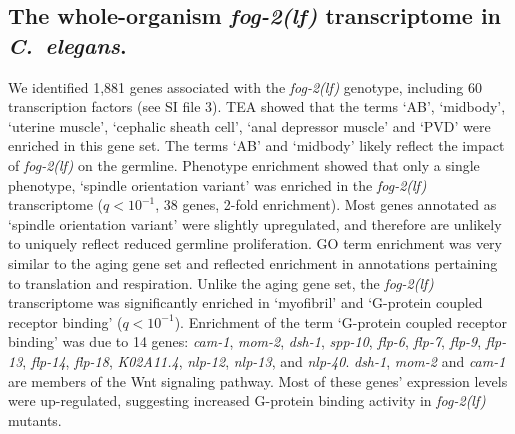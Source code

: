 \documentclass[10pt,letterpaper,twocolumn]{article}
\newcommand{\cel}{\emph{C.~elegans}}
\newcommand{\fog}{\emph{\mbox{fog-2(lf)}}}
\newcommand{\gene}[1]{\emph{\mbox{#1}}}
\newcommand{\fogn}{1,881}
\newcommand{\tffog}{60}
\begin{document}
\subsection*{The whole-organism \fog{} transcriptome in \cel{}.}
We identified \fogn{} genes associated with the \fog{} genotype, including
\tffog{} transcription factors (see SI file 3). TEA showed that the terms `AB',
`midbody', `uterine muscle', `cephalic sheath cell', `anal depressor muscle' and
`PVD' were enriched in this gene set. The terms `AB' and `midbody' likely reflect
the impact of \fog{} on the germline.
Phenotype enrichment showed that only a single phenotype, `spindle orientation
variant' was enriched in the \fog{} transcriptome ($q<10^{-1}$, 38 genes, 2-fold
enrichment). Most genes annotated as `spindle orientation variant' were
slightly upregulated, and therefore are unlikely to uniquely reflect reduced
germline proliferation. GO term enrichment was very similar to the aging gene
set and reflected enrichment in annotations pertaining to translation and
respiration. Unlike the aging gene set, the \fog{} transcriptome was
significantly enriched in `myofibril' and `G-protein coupled receptor binding'
($q<10^{-1}$). Enrichment of the term `G-protein coupled receptor binding' was
due to 14 genes: \gene{cam-1}, \gene{mom-2},  \gene{dsh-1}, \gene{spp-10},
\gene{flp-6}, \gene{flp-7}, \gene{flp-9}, \gene{flp-13}, \gene{flp-14},
\gene{flp-18},
\gene{K02A11.4}, \gene{nlp-12}, \gene{nlp-13}, and \gene{nlp-40}.
\gene{dsh-1},
\gene{mom-2} and \gene{cam-1} are members of the Wnt signaling pathway.
Most of these genes' expression levels were up-regulated, suggesting increased
G-protein binding activity in \fog{} mutants.
\end{document}
